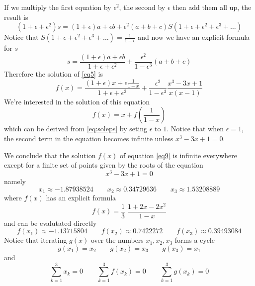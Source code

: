 \documentclass[a4paper]{article}
\begin{document}
If we multiply the first equation by $\epsilon^2$, the second by $\epsilon$ then add them all up, the result is
$$(1 + \epsilon + \epsilon^2)s = (1+\epsilon)a + \epsilon b + \epsilon^2 (a+b+c) S(1 + \epsilon + \epsilon^2 + \epsilon^3 + \dots)$$
Notice that $S(1 + \epsilon + \epsilon^2 + \epsilon^3 + \dots) = \frac{1}{1-\epsilon}$ and now we have an explicit formula for $s$
$$s=\frac{(1+\epsilon) a + \epsilon b}{1+\epsilon+\epsilon^2} + \frac{\epsilon^2}{1-\epsilon^3}(a+b+c)$$
Therefore the solution of \eqref{eq5} is
\begin{equation}
f(x) = \frac{(1+\epsilon)x + \epsilon\frac{1}{1-x}}{1+\epsilon+\epsilon^2} + \frac{\epsilon^2}{1-\epsilon^3}\frac{x^3-3x+1}{x(x-1)}\label{eq:soleps}
\end{equation}
We're interested in the solution of this equation
\begin{equation}
f(x) = x + f(\frac{1}{1-x})\label{eq9}
\end{equation}
which can be derived from \eqref{eq:soleps} by seting $\epsilon$ to $1$.
Notice that when $\epsilon=1$, the second term in the equation becomes infinite unless $x^3-3x+1=0$.

We conclude that the solution $f(x)$ of equation \eqref{eq9} is infinite everywhere except for a finite set of points given by the roots of the equation
$$x^3-3x+1=0$$
namely
\begin{equation*}
x_1 \approx -1.87938524
\qquad
x_2 \approx 0.34729636
\qquad
x_3 \approx 1.53208889
\end{equation*}
where $f(x)$ has an explicit formula
$$f(x)=\frac{1}{3}\;\frac{1 + 2x - 2x^2}{1-x}$$
and can be evalutated directly
\begin{equation*}
f(x_1) \approx -1.13715804
\qquad
f(x_2) \approx 0.7422272
\qquad
f(x_3) \approx 0.39493084
\end{equation*}
Notice that iterating $g(x)$ over the numbers $x_1,x_2,x_3$ forms a cycle
\begin{equation*}
g(x_1) = x_2
\qquad
g(x_2) = x_3
\qquad
g(x_3) = x_1
\end{equation*}
and
\begin{equation*}
\sum_{k=1}^{3}{x_k} = 0
\qquad
\sum_{k=1}^{3}{f(x_k)} = 0
\qquad
\sum_{k=1}^{3}{g(x_k)} = 0
\end{equation*}
\end{document}
